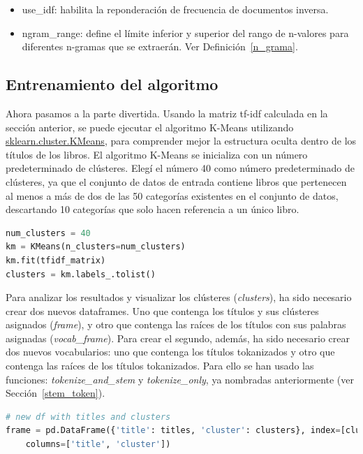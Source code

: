 \documentclass{uimppracticas}
\begin{document}
\begin{itemize}
	\item use\_idf: habilita la reponderación de frecuencia de documentos inversa.
	\item ngram\_range: define el límite inferior y superior del rango de n-valores para diferentes n-gramas que se extraerán. Ver Definición~\ref{n_grama}.
\end{itemize}

\subsection{Entrenamiento del algoritmo}

Ahora pasamos a la parte divertida. Usando la matriz tf-idf calculada en la sección anterior, se puede ejecutar el algoritmo K-Means utilizando \href{https://scikit-learn.org/stable/modules/generated/sklearn.cluster.KMeans.html}{sklearn.cluster.KMeans}, para comprender mejor la estructura oculta dentro de los títulos de los libros. El algoritmo K-Means se inicializa con un número predeterminado de clústeres. Elegí el número 40 como número predeterminado de clústeres, ya que el conjunto de datos de entrada contiene libros que pertenecen al menos a más de dos de las 50 categorías existentes en el conjunto de datos, descartando 10 categorías que solo hacen referencia a un único libro.

\begin{lstlisting}[language=python]
num_clusters = 40
km = KMeans(n_clusters=num_clusters)
km.fit(tfidf_matrix)
clusters = km.labels_.tolist()
\end{lstlisting}

Para analizar los resultados y visualizar los clústeres (\textit{clusters}), ha sido necesario crear dos nuevos dataframes. Uno que contenga los títulos y sus clústeres asignados (\textit{frame}), y otro que contenga las raíces de los títulos con sus palabras asignadas (\textit{vocab\_frame}). Para crear el segundo, además, ha sido necesario crear dos nuevos vocabularios: uno que contenga los títulos tokanizados y otro que contenga las raíces de los títulos tokanizados. Para ello se han usado las funciones: \textit{tokenize\_and\_stem} y \textit{tokenize\_only}, ya nombradas anteriormente (ver Sección~\ref{stem_token}).

\begin{lstlisting}[language=python]
# new df with titles and clusters
frame = pd.DataFrame({'title': titles, 'cluster': clusters}, index=[clusters], 
	columns=['title', 'cluster'])
\end{lstlisting}
\end{document}
